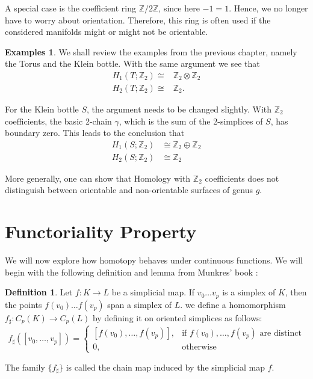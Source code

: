 \documentclass[draft,toc=bib]{scrartcl}
\theoremstyle{plain}
\theoremstyle{definition}
\newtheorem	{definition}[theorem]{Definition}
\newtheorem{examples}[theorem]{Examples}
\theoremstyle{remark}
\newcommand{\isom}{\cong}
\newcommand{\Z}{\mathbb{Z}}
\begin{document}
A special case is the coefficient ring $\Z/2\Z$, since here $-1=1$. Hence, we no longer have to worry about orientation. Therefore, this ring is often used if the considered manifolds might or might not be orientable.


\begin{examples}
	We shall review the examples from the previous chapter, namely the Torus and the Klein bottle. With the same argument we see that
	\begin{align*}
		H_1(T;\Z_2)\isom& \Z_2\otimes\Z_2\\
		H_2(T;\Z_2)\isom& \Z_2.
	\end{align*}
	
	For the Klein bottle $S$, the argument needs to be changed slightly. With $\Z_2$ coefficients, the basic 2-chain $\gamma$, which is the sum of the 2-simplices of $S$, has boundary zero. This leads to the conclusion that 
	\begin{align*}
		H_1(S;\Z_2)&\isom \Z_2\oplus \Z_2\\
		H_2(S;\Z_2)&\isom \Z_2
	\end{align*}

	More generally, one can show that Homology with $\Z_2$ coefficients does not distinguish between orientable and non-orientable surfaces of genus $g$.
\end{examples}


\section{Functoriality Property}
We will now explore how homotopy behaves under continuous functions. We will begin with the following definition and lemma from Munkres' book \cite[lemma 12.1, p. 62]{mu}:

\begin{definition}
	Let $f: K\to L$ be a simplicial map. If $v_0\dots v_p$ is a simplex of $K$, then the points $f(v_0)\dots f(v_p)$ span a simplex of $L$. we define a homomorphism $f_\sharp: C_p(K)\to C_p(L)$ by defining it on oriented simplices as follows:
	\[
	f_\sharp([v_0,\dots,v_p])=\begin{cases}
	[f(v_0),\dots, f(v_p)],& \text{if } f(v_0),\dots, f(v_p) \text{ are distinct}\\
	0,&\text{otherwise}
	\end{cases}
	\]
	
	The family $\{f_\sharp\}$ is called the chain map induced by the simplicial map $f$.
\end{definition}
\end{document}
